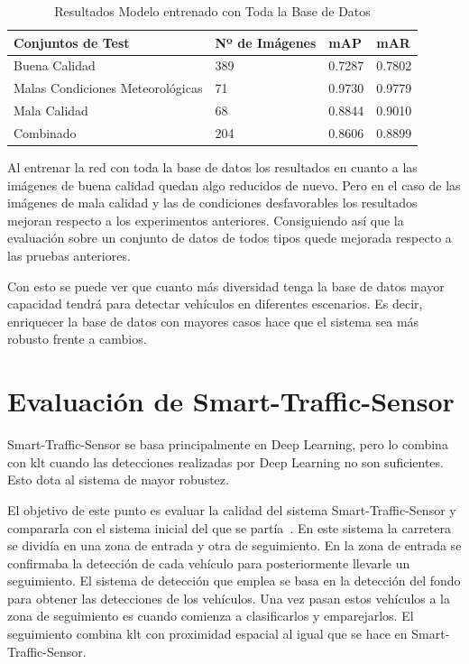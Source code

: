 \begin{table}[htbp][H] 
\begin{center}
\begin{tabular}{|l|l|l|l|}
\hline
 Conjuntos de Test & Nº de Imágenes & mAP & mAR  \\ 
\hline \hline
Buena Calidad & 389 & 0.7287 & 0.7802 \\ \hline
Malas Condiciones Meteorológicas & 71 & 0.9730 & 0.9779 \\ \hline
Mala Calidad  & 68 & 0.8844 & 0.9010\\ \hline
Combinado & 204 & 0.8606 & 0.8899\\ \hline
\end{tabular}
\caption{Resultados Modelo entrenado con Toda la Base de Datos}
\label{resultados_test_todas_img}
\end{center}
\end{table}

Al entrenar la red con toda la base de datos los resultados en cuanto a las imágenes de buena calidad quedan algo reducidos de nuevo. Pero en el caso de las imágenes de mala calidad y las de condiciones desfavorables los resultados mejoran respecto  a los experimentos anteriores. Consiguiendo así que la evaluación sobre un conjunto de datos de todos tipos quede mejorada respecto a las pruebas anteriores. 

Con esto se puede ver que cuanto más diversidad tenga la base de datos mayor capacidad tendrá para detectar vehículos en diferentes escenarios. Es decir, enriquecer la base de datos con mayores casos hace que el sistema sea más robusto frente a cambios. 

\section{Evaluación de Smart-Traffic-Sensor}

Smart-Traffic-Sensor se basa principalmente en Deep Learning, pero lo combina con \acrshort{klt} cuando las detecciones realizadas por Deep Learning no son suficientes. Esto dota al sistema de mayor robustez. 

El objetivo de este punto es evaluar la calidad del sistema Smart-Traffic-Sensor y compararla con el sistema inicial del que se partía~\cite{redo_tesis}. En este sistema la carretera se dividía en una zona de entrada y otra de seguimiento. En la zona de entrada se confirmaba la detección de cada vehículo para posteriormente llevarle un seguimiento.  El sistema de detección que emplea se  basa en la detección del fondo para obtener las detecciones de los vehículos. Una vez pasan estos vehículos a la zona de seguimiento es cuando comienza a clasificarlos y emparejarlos. El seguimiento combina \acrshort{klt} con proximidad espacial al igual que se hace en Smart-Traffic-Sensor.

